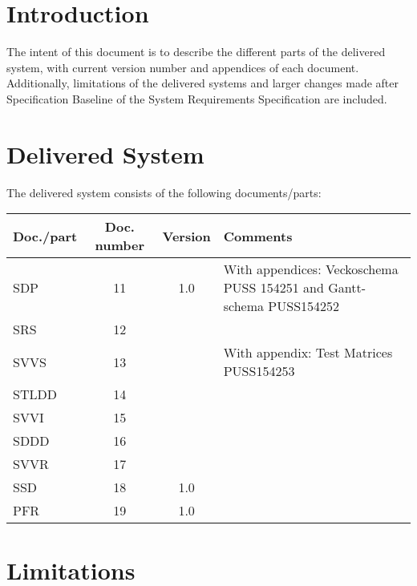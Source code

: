 \documentclass[a4paper]{article}
\begin{document}
\section{Introduction}

The intent of this document is to describe the different parts of the delivered system, with current version number and appendices of each document. Additionally, limitations of the delivered systems and larger changes made after Specification Baseline of the System Requirements Specification are included.



\section{Delivered System}

The delivered system consists of the following documents/parts:

\begin{center}
\begin{tabular}{| l | c | c | p{5cm} |}
    \hline
    \textbf{Doc./part} & \textbf{Doc. number} & \textbf{Version} & \textbf{Comments} \\ \hline
    SDP & 11 & 1.0 & With appendices: Veckoschema PUSS 154251 and Gantt-schema PUSS154252 \\ \hline
    SRS & 12 &  & \\ \hline
    SVVS & 13 & & With appendix: Test Matrices PUSS154253 \\ \hline
    STLDD & 14 & & \\ \hline
    SVVI & 15 & & \\ \hline
    SDDD & 16 & & \\ \hline
    SVVR & 17 & & \\ \hline
    SSD & 18 & 1.0 & \\ \hline
    PFR & 19 & 1.0 & \\ \hline

\end{tabular}
\end{center}

\section{Limitations}
\end{document}
